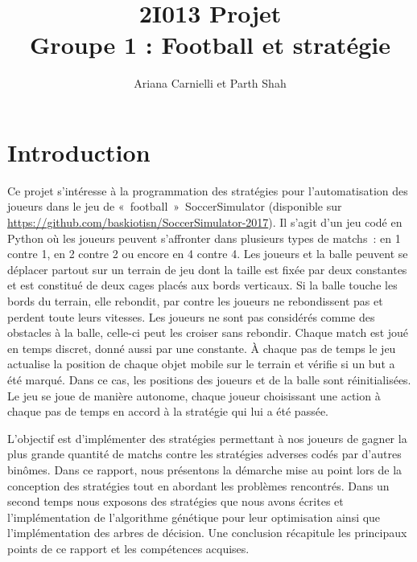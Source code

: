 \documentclass[a4paper,12pt]{article}
\begin{document}
\title{2I013 Projet \\ Groupe 1 : Football et stratégie}
\author{Ariana Carnielli et Parth Shah}
\date{}

\maketitle
\thispagestyle{empty}

\tableofcontents
\newpage

\pagestyle{plain}

\section{Introduction}

Ce projet s’intéresse à la programmation des stratégies pour l’automatisation des joueurs dans le jeu de  « football » SoccerSimulator (disponible sur \url{https://github.com/baskiotisn/SoccerSimulator-2017}). Il s'agit d'un jeu codé en Python où les joueurs peuvent s’affronter dans plusieurs types de matchs : en 1 contre 1, en 2 contre 2 ou encore en 4 contre 4. Les joueurs et la balle peuvent se déplacer partout sur un terrain de jeu dont la taille est fixée par deux constantes et est constitué de deux cages placés aux bords verticaux. Si la balle touche les bords du terrain, elle rebondit, par contre les joueurs ne rebondissent pas et perdent toute leurs vitesses. Les joueurs ne sont pas considérés comme des obstacles à la balle, celle-ci peut les croiser sans rebondir. Chaque match est joué en temps discret, donné aussi par une constante. À chaque pas de temps le jeu actualise la position de chaque objet mobile sur le terrain et vérifie si un but a été marqué. Dans ce cas, les positions des joueurs et de la balle sont réinitialisées. Le jeu se joue de manière autonome, chaque joueur choisissant une action à chaque pas de temps en accord à la stratégie qui lui a été passée.

L’objectif est d’implémenter des stratégies permettant à nos joueurs de gagner la plus grande quantité de matchs contre les stratégies adverses codés par d'autres binômes. Dans ce rapport, nous présentons la démarche mise au point lors de la conception des stratégies tout en abordant les problèmes rencontrés. Dans un second temps nous exposons des stratégies que nous avons écrites et l'implémentation de l’algorithme génétique pour leur optimisation ainsi que l’implémentation des arbres de décision. Une conclusion récapitule les principaux points de ce rapport et les compétences acquises.
\end{document}
